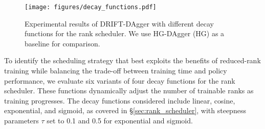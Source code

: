 \begin{figure}[htbp]
\centering
\begin{minipage}{\columnwidth}
\texttt{[image: figures/decay\_functions.pdf]}
\caption{Experimental results of DRIFT-DAgger with different decay functions for the rank scheduler. We use HG-DAgger (HG) as a baseline for comparison.}
\label{fig:decay_functions}
\end{minipage}

\vspace{1em} 

\begin{minipage}{\columnwidth}
    \centering
    \renewcommand\arraystretch{1.2}
\end{minipage}
\end{figure}
To identify the scheduling strategy that best exploits the benefits of reduced-rank training while balancing the trade-off between training time and policy performance, we evaluate six variants of four decay functions for the rank scheduler. These functions dynamically adjust the number of trainable ranks as training progresses. The decay functions considered include linear, cosine, exponential, and sigmoid, as covered in \S\ref{sec:rank_scheduler}, with steepness parameters $\tau$ set to 0.1 and 0.5 for exponential and sigmoid. 

